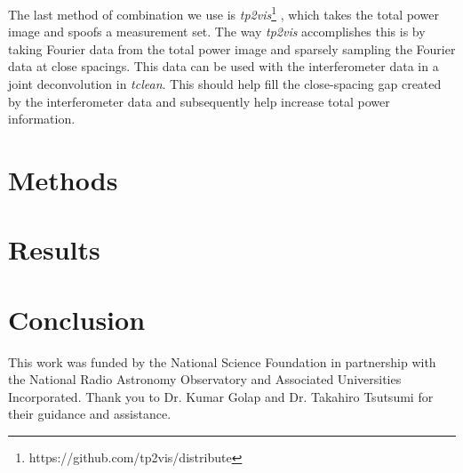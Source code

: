 \documentclass[manuscript,linenumbers]{aastex62}
\begin{document}
The last method of combination we use is \textit{tp2vis}\footnote{https://github.com/tp2vis/distribute} \citep[see][]{2011ApJS..193...19K}, which takes the total power image and spoofs a measurement set. The way \textit{tp2vis} accomplishes this is by taking Fourier data from the total power image and sparsely sampling the Fourier data at close spacings. This data can be used with the interferometer data in a joint deconvolution in \textit{tclean}. This should help fill the close-spacing gap created by the interferometer data and subsequently help increase total power information.

\section{Methods}

\section{Results}

\section{Conclusion}


\acknowledgments
This work was funded by the National Science Foundation in partnership with the National Radio Astronomy Observatory and Associated Universities Incorporated. Thank you to Dr. Kumar Golap and Dr. Takahiro Tsutsumi for their guidance and assistance. 


\end{document}

